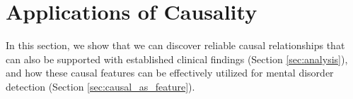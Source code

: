 \section{Applications of Causality}
\label{sec:application}


In this section, we show that we can discover reliable causal relationships that can also be supported with established clinical findings (Section \ref{sec:analysis}), and how these causal features can be effectively utilized for mental disorder detection (Section \ref{sec:causal_as_feature}).


